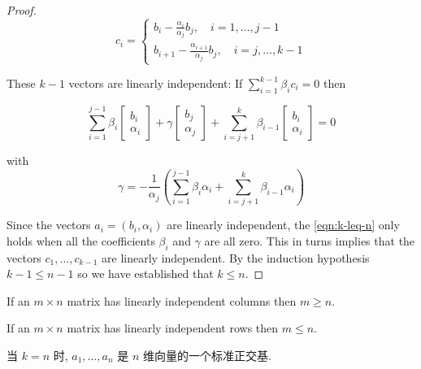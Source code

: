 \begin{proof}
    $$c_{i}=\left\{\begin{matrix} 
        b_{i}-\frac{\alpha_{i}}{\alpha_{j}} b_{j}, \quad i=1, \ldots, j-1  \\  
       b_{i+1}-\frac{\alpha_{i+1}}{\alpha_{j}} b_{j}, \quad i=j, \ldots, k-1  
     \end{matrix}\right. $$

     These $ k-1 $ vectors are linearly independent: If $ \sum_{i=1}^{k-1} \beta_{i} c_{i}=0 $ then

    \begin{equation}
        \label{eqn:k-leq-n}
        \sum_{i=1}^{j-1} \beta_{i}\left[\begin{array}{c}
        b_{i} \\
        \alpha_{i}
        \end{array}\right]+\gamma\left[\begin{array}{c}
        b_{j} \\
        \alpha_{j}
        \end{array}\right]+\sum_{i=j+1}^{k} \beta_{i-1}\left[\begin{array}{c}
        b_{i} \\
        \alpha_{i}
        \end{array}\right]=0
    \end{equation}

    with
    $$
    \gamma=-\frac{1}{\alpha_{j}}\left(\sum_{i=1}^{j-1} \beta_{i} \alpha_{i}+\sum_{i=j+1}^{k} \beta_{i-1} \alpha_{i}\right)
    $$

    Since the vectors $ a_{i}=\left(b_{i}, \alpha_{i}\right) $ are linearly independent, the \cref{eqn:k-leq-n} only holds when all the coefficients $ \beta_{i} $ and $ \gamma $ are all zero. This in turns implies that the vectors $ c_{1}, \ldots, c_{k-1} $ are linearly independent. By the induction hypothesis $ k-1 \leq n-1 $ so we have established that $ k \leq n $.
\end{proof}

\begin{corollary}
    If an $ m \times n $ matrix has linearly independent columns then $ m \geq n $. 
\end{corollary}

\begin{corollary}
    If an $ m \times n $ matrix has linearly independent rows then $ m \leq n $.
\end{corollary}

\begin{definition}[$n$维向量的一个标准正交基]
    当 $ k=n $ 时,  $ a_{1}, \ldots, a_{n} $ 是 $ n $ 维向量的一个标准正交基. 
\end{definition}

